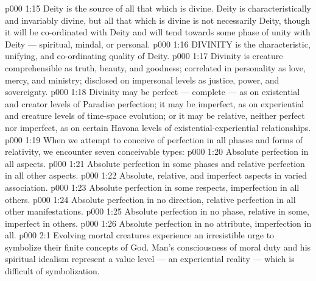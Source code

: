 \vs p000 1:15 Deity is the source of all that which is divine. Deity is characteristically and invariably divine, but all that which is divine is not necessarily Deity, though it will be co\hyp{}ordinated with Deity and will tend towards some phase of unity with Deity --- spiritual, mindal, or personal.
\vs p000 1:16 \pc DIVINITY is the characteristic, unifying, and co\hyp{}ordinating quality of Deity.
\vs p000 1:17 Divinity is creature comprehensible as truth, beauty, and goodness; correlated in personality as love, mercy, and ministry; disclosed on impersonal levels as justice, power, and sovereignty.
\vs p000 1:18 Divinity may be perfect --- complete --- as on existential and creator levels of Paradise perfection; it may be imperfect, as on experiential and creature levels of time\hyp{}space evolution; or it may be relative, neither perfect nor imperfect, as on certain Havona levels of existential\hyp{}experiential relationships.
\vs p000 1:19 \pc When we attempt to conceive of perfection in all phases and forms of relativity, we encounter seven conceivable types:
\vs p000 1:20 \bibnobreakspace Absolute perfection in all aspects.
\vs p000 1:21 \bibnobreakspace Absolute perfection in some phases and relative perfection in all other aspects.
\vs p000 1:22 \bibnobreakspace Absolute, relative, and imperfect aspects in varied association.
\vs p000 1:23 \bibnobreakspace Absolute perfection in some respects, imperfection in all others.
\vs p000 1:24 \bibnobreakspace Absolute perfection in no direction, relative perfection in all other manifestations.
\vs p000 1:25 \bibnobreakspace Absolute perfection in no phase, relative in some, imperfect in others.
\vs p000 1:26 \bibnobreakspace Absolute perfection in no attribute, imperfection in all.
\vs p000 2:1 Evolving mortal creatures experience an irresistible urge to symbolize their finite concepts of God. Man’s consciousness of moral duty and his spiritual idealism represent a value level --- an experiential reality --- which is difficult of symbolization.
